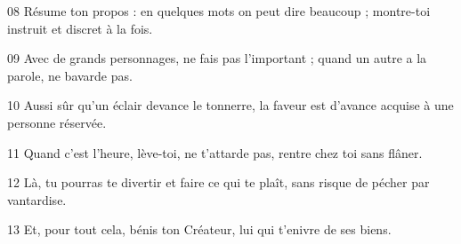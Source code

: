 
08 Résume ton propos : en quelques mots on peut dire beaucoup ; montre-toi instruit et discret à la fois.

09 Avec de grands personnages, ne fais pas l’important ; quand un autre a la parole, ne bavarde pas.

10 Aussi sûr qu’un éclair devance le tonnerre, la faveur est d’avance acquise à une personne réservée.

11 Quand c’est l’heure, lève-toi, ne t’attarde pas, rentre chez toi sans flâner.

12 Là, tu pourras te divertir et faire ce qui te plaît, sans risque de pécher par vantardise.

13 Et, pour tout cela, bénis ton Créateur, lui qui t’enivre de ses biens.